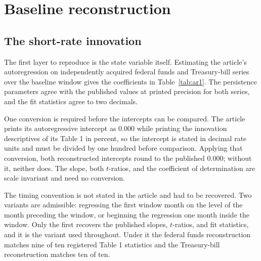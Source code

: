 \documentclass[11pt]{article}
\begin{document}
\section{Baseline reconstruction}
\label{sec:baseline}

\subsection{The short-rate innovation}

The first layer to reproduce is the state variable itself. Estimating the
article's autoregression on independently acquired federal funds and Treasury-bill
series over the baseline window gives the coefficients in
Table~\ref{tab:ar1}. The persistence parameters agree with the published values
at printed precision for both series, and the fit statistics agree to two
decimals.

One conversion is required before the intercepts can be compared. The article
prints its autoregressive intercept as $0.000$ while printing the innovation %
descriptives of its Table 1 in percent, so the intercept is stated in decimal %
rate units and must be divided by one hundred before comparison. Applying that
conversion, both reconstructed intercepts round to the published $0.000$; without %
it, neither does. The slope, both $t$-ratios, and the coefficient of
determination are scale invariant and need no conversion. %



The timing convention is not stated in the article and had to be recovered. Two
variants are admissible: regressing the first window month on the level of the
month preceding the window, or beginning the regression one month inside the
window. Only the first recovers the published slopes, $t$-ratios, and fit
statistics, and it is the variant used throughout. Under it the federal funds
reconstruction matches nine of ten registered Table 1 statistics and the %
Treasury-bill reconstruction matches ten of ten. %
\end{document}
